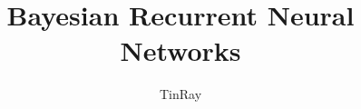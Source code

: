 \documentclass{beamer}
\title{Bayesian Recurrent Neural Networks}
\date{TinRay}
\begin{document}
\frame{\titlepage}




% 
% 
% 
\end{document}
